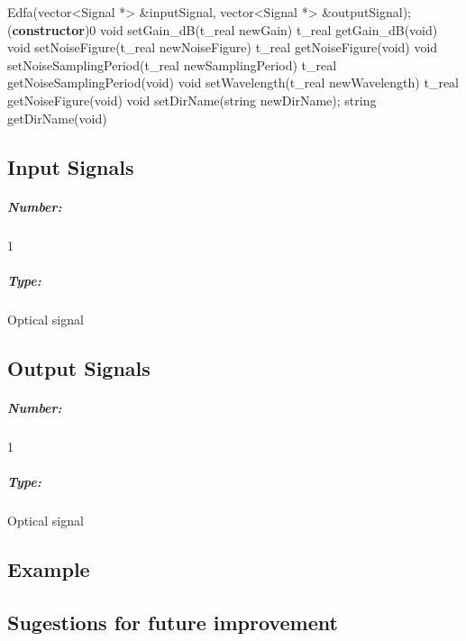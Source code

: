 Edfa(vector<Signal *> \&inputSignal, vector<Signal *> \&outputSignal);
(\textbf{constructor})0
\bigbreak
void setGain\_dB(t\_real newGain)
\bigbreak
t\_real getGain\_dB(void)
\bigbreak
void setNoiseFigure(t\_real newNoiseFigure)
\bigbreak
t\_real getNoiseFigure(void)
\bigbreak
void setNoiseSamplingPeriod(t\_real newSamplingPeriod)
\bigbreak
t\_real getNoiseSamplingPeriod(void)
\bigbreak
void setWavelength(t\_real newWavelength)
\bigbreak
t\_real getNoiseFigure(void)
\bigbreak
void setDirName(string newDirName);
\bigbreak
string getDirName(void)
\bigbreak
%

\subsection*{Input Signals}

\subparagraph*{Number:} 1

\subparagraph*{Type:} Optical signal

\subsection*{Output Signals}

\subparagraph*{Number:} 1

\subparagraph*{Type:} Optical signal

\subsection*{Example}

\subsection*{Sugestions for future improvement}
